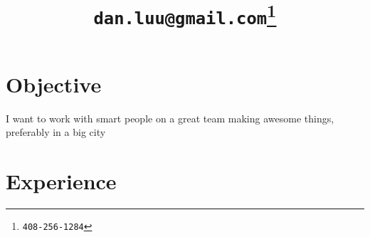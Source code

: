 \documentclass[letterpaper]{scrartcl}
\begin{document}
\title{\vspace{-6ex}\tt{dan.luu@gmail.com\footnote{408-256-1284}}}
\date{\vspace{-10ex}}
\author{}
\maketitle

%
%



%
%
\section*{Objective}
\begin{list1}
\item I want to work with smart people on a great team making awesome things, preferably in a big city
\end{list1}

\section*{Experience}
\end{document}
